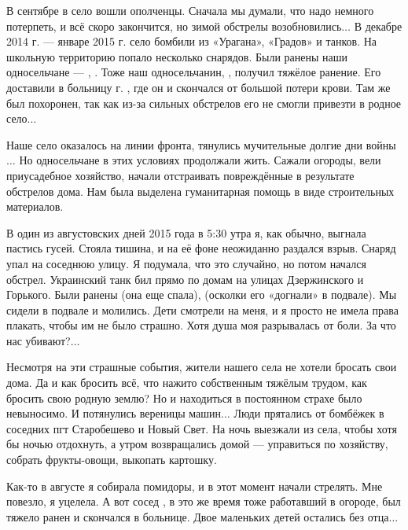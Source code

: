 В сентябре в село вошли ополченцы. Сначала мы думали, что надо немного
потерпеть, и всё скоро закончится, но зимой обстрелы возобновились$\ldots$ В декабре
2014 г. --- январе 2015 г. село бомбили из «Урагана», «Градов» и танков. На
школьную территорию попало несколько снарядов. Были ранены наши односельчане ---
, . Тоже наш односельчанин, 
, получил тяжёлое ранение. Его доставили в больницу г. , где
он и скончался от большой потери крови. Там же был похоронен, так как из-за
сильных обстрелов его не смогли привезти в родное село...

Наше село оказалось на линии фронта, тянулись мучительные долгие дни войны$\ldots$ Но
односельчане в этих условиях продолжали жить. Сажали огороды, вели приусадебное
хозяйство, начали отстраивать повреждённые в результате обстрелов дома. Нам
была выделена гуманитарная помощь в виде строительных материалов.

В один из августовских дней 2015 года в 5:30 утра я, как обычно, выгнала
пастись гусей. Стояла тишина, и на её фоне неожиданно раздался взрыв. Снаряд
упал на соседнюю улицу. Я подумала, что это случайно, но потом начался обстрел.
Украинский танк бил прямо по домам на улицах Дзержинского и Горького. Были
ранены  (она еще спала),  (осколки его
«догнали» в подвале). Мы сидели в подвале и молились. Дети смотрели на меня, и
я просто не имела права плакать, чтобы им не было страшно. Хотя душа моя
разрывалась от боли. За что нас убивают?$\ldots$

Несмотря на эти страшные события, жители нашего села не хотели бросать свои
дома. Да и как бросить всё, что нажито собственным тяжёлым трудом, как бросить
свою родную землю? Но и находиться в постоянном страхе было невыносимо. И
потянулись вереницы машин$\ldots$ Люди прятались от бомбёжек в соседних пгт
Старобешево и Новый Свет. На ночь выезжали из села, чтобы хотя бы ночью
отдохнуть, а утром возвращались домой --- управиться по хозяйству, собрать
фрукты-овощи, выкопать картошку.

Как-то в августе я собирала помидоры, и в этот момент начали стрелять. Мне
повезло, я уцелела. А вот сосед , в это же время тоже работавший в
огороде, был тяжело ранен и скончался в больнице. Двое маленьких детей остались
без отца$\ldots$


